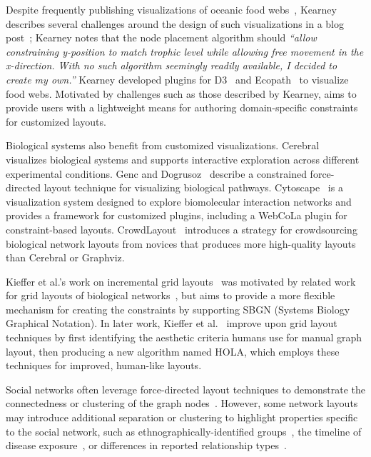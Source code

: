 Despite frequently publishing visualizations of oceanic food 
webs~\cite{kearney2012coupling,kearney2013amplification},
Kearney describes several challenges around the design of such visualizations
in a blog post~\cite{kearney2016blog}; Kearney notes that the node
placement algorithm should \emph{``allow constraining y-position to match
  trophic level while allowing free movement in the x-direction. With no
  such algorithm seemingly readily available, I decided to create my
  own.''} Kearney developed plugins for D3~\cite{kearney2017d3} and
Ecopath~\cite{kearney2017ecopath} to visualize food webs. 
Motivated by challenges such as those
described by Kearney, \projectname aims to provide users
with a lightweight means for authoring domain-specific constraints for customized layouts.

Biological systems also benefit from customized visualizations.
Cerebral~\cite{barsky2008cerebral} visualizes
biological systems and supports interactive exploration across different
experimental conditions. Genc and Dogrusoz~\cite{genc2003constrained}
describe a constrained force-directed layout technique for visualizing 
biological pathways. Cytoscape~\cite{shannon2003cytoscape} is a
visualization system designed to explore biomolecular interaction networks
and provides a framework for customized plugins, including 
a WebCoLa plugin for constraint-based layouts.
CrowdLayout~\cite{singh2018crowdlayout} introduces a strategy for crowdsourcing 
biological network layouts from novices that produces more high-quality
layouts than Cerebral or Graphviz.

Kieffer et al.'s work on incremental grid layouts~\cite{kieffer2013incremental}
was motivated by related work for grid layouts of biological 
networks~\cite{barsky2008cerebral,kojima2007efficient,li2005grid}, 
but aims to provide a more flexible mechanism for creating the constraints 
by supporting SBGN (Systems Biology Graphical Notation). In later
work, Kieffer et al.~\cite{kieffer2016hola} improve upon grid layout techniques
by first identifying the aesthetic criteria humans use for manual graph layout,
then producing a new algorithm named HOLA, which employs these techniques for improved,
human-like layouts.

Social networks often leverage force-directed layout techniques to demonstrate the 
connectedness or clustering of the graph nodes~\cite{scott1988social}. 
However, some network layouts may introduce additional separation or clustering
to highlight properties specific to the social network, 
such as ethnographically-identified groups~\cite{rothenberg1998using},
the timeline of disease exposure~\cite{fitzpatrick2001preventable,mcelroy2003network},
or differences in reported relationship types~\cite{fu2011hiv}.

